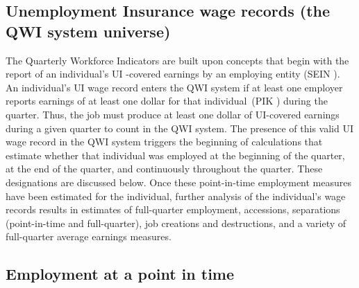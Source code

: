 \subsection{Unemployment Insurance wage records (the QWI system universe)}


The Quarterly Workforce Indicators are built upon concepts that begin with
the report of an individual's UI%
-covered earnings by an employing entity (SEIN%
). An individual's {UI} wage record enters the QWI system if at
least one employer reports earnings of at least one dollar for that
individual\ (PIK%
) during the quarter. Thus, the job must produce at least one
dollar of {UI}-covered earnings during a given quarter to count in the QWI
system. The presence of this valid {UI} wage record in the QWI system
triggers the beginning of calculations that estimate whether that individual
was employed at the beginning of the quarter, at the end of the quarter, and
continuously throughout the quarter. These designations are discussed below.
Once these point-in-time employment measures have been estimated for the
individual, further analysis of the individual's wage records results in
estimates of full-quarter employment, accessions, separations (point-in-time
and full-quarter), job creations and destructions, and a variety of
full-quarter average earnings measures.

\subsection{Employment at a point in time}


